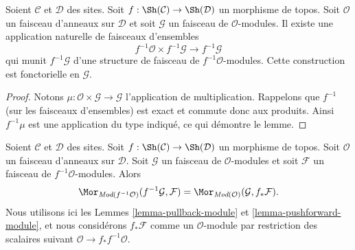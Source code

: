\begin{lemma}
\label{lemma-pullback-module}
Soient $\mathcal{C}$ et $\mathcal{D}$ des sites. Soit
$f : \Sh(\mathcal{C}) \to \Sh(\mathcal{D})$ un morphisme de topos. Soit
$\mathcal{O}$ un faisceau d'anneaux sur $\mathcal{D}$ et soit $\mathcal{G}$ un
faisceau de $\mathcal{O}$-modules. Il existe une application naturelle de
faisceaux d'ensembles
$$
f^{-1}\mathcal{O} \times f^{-1}\mathcal{G}
\longrightarrow
f^{-1}\mathcal{G}
$$
qui munit $f^{-1}\mathcal{G}$ d'une structure de faisceau de
$f^{-1}\mathcal{O}$-modules. Cette construction est fonctorielle en
$\mathcal{G}$.
\end{lemma}

\begin{proof}
Notons $\mu : \mathcal{O} \times \mathcal{G} \to \mathcal{G}$ l'application
de multiplication. Rappelons que $f^{-1}$ (sur les faisceaux d'ensembles) est
exact et commute donc aux produits. Ainsi $f^{-1}\mu$ est une application du
type indiqué, ce qui démontre le lemme.
\end{proof}

\begin{lemma}
\label{lemma-adjoint-push-pull-modules}
Soient $\mathcal{C}$ et $\mathcal{D}$ des sites. Soit
$f : \Sh(\mathcal{C}) \to \Sh(\mathcal{D})$ un morphisme de topos. Soit
$\mathcal{O}$ un faisceau d'anneaux sur $\mathcal{D}$. Soit $\mathcal{G}$ un
faisceau de $\mathcal{O}$-modules et soit $\mathcal{F}$ un faisceau de
$f^{-1}\mathcal{O}$-modules. Alors
$$
\Mor_{\textit{Mod}(f^{-1}\mathcal{O})}(f^{-1}\mathcal{G}, \mathcal{F})
=
\Mor_{\textit{Mod}(\mathcal{O})}(\mathcal{G}, f_*\mathcal{F}).
$$
Nous utilisons ici les Lemmes \ref{lemma-pullback-module} et
\ref{lemma-pushforward-module}, et nous considérons $f_*\mathcal{F}$ comme un
$\mathcal{O}$-module par restriction des scalaires suivant
$\mathcal{O} \to f_*f^{-1}\mathcal{O}$.
\end{lemma}

